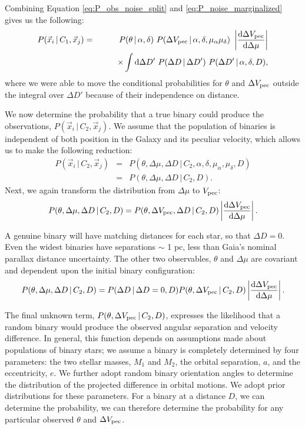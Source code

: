 \documentclass[12pt, preprint]{aastex}
\newcommand{\given}{\,|\,}
\newcommand{\dd}{\mathrm{d}}
\begin{document}
Combining Equation \ref{eq:P_obs_noise_split} and \ref{eq:P_noise_marginalized} gives us the following:
\begin{eqnarray}
P(\vec{x}_i \given C_1, \vec{x}_j) &=& P(\theta \given \alpha, \delta)\ 
   P(\Delta V_{\rm pec} \given \alpha, \delta, \mu_{\alpha} \mu_{\delta})\ 
   \left| \frac{\dd \Delta V_{\rm pec}}{\dd \Delta \mu} \right| \nonumber \\
   & & \qquad \times  \int \dd \Delta D'\ P(\Delta D \given \Delta D')\ P(\Delta D' \given \alpha, \delta, D),
\end{eqnarray}
where we were able to move the conditional probabilities for $\theta$ and $\Delta V_{\rm pec}$ outside the integral over $\Delta D'$ because of their independence on distance.


We now determine the probability that a true binary could produce the observations, $P(\vec{x}_i \given C_2, \vec{x}_j)$. We assume that the population of binaries is independent of both position in the Galaxy and its peculiar velocity, which allows us to make the following reduction:
\begin{eqnarray}
P(\vec{x}_i \given C_2, \vec{x}_j) &=& P(\theta, \Delta \mu, \Delta D \given C_2, \alpha, \delta, \mu_{\alpha}, \mu_{\delta}, D ) \\
&=& P(\theta, \Delta \mu, \Delta D \given C_2, D).
\end{eqnarray}
Next, we again transform the distribution from $\Delta \mu$ to $V_{\rm pec}$:
\begin{equation}
P(\theta, \Delta \mu, \Delta D \given C_2, D) = P(\theta, \Delta V_{\rm pec}, \Delta D \given C_2, D) \left| \frac{\dd \Delta V_{\rm pec}}{\dd \Delta \mu} \right|.
\end{equation}

A genuine binary will have matching distances for each star, so that $\Delta D = 0$. Even the widest binaries have separations $\sim$ 1 pc, less than Gaia's nominal parallax distance uncertainty. The other two observables, $\theta$ and $\Delta \mu$ are covariant and dependent upon the initial binary configuration:
\begin{equation}
P(\theta, \Delta \mu, \Delta D \given C_2, D) = P(\Delta D \given \Delta D=0, D) P(\theta, \Delta V_{\rm pec} \given C_2, D) \left| \frac{\dd \Delta V_{\rm pec}}{\dd \Delta \mu} \right|.
\end{equation}

The final unknown term, $P(\theta, \Delta V_{\rm pec} \given C_2, D)$, expresses the likelihood that a random binary would produce the observed angular separation and velocity difference. In general, this function depends on assumptions made about populations of binary stars; we assume a binary is completely determined by four parameters: the two stellar masses, $M_1$ and $M_2$, the orbital separation, $a$, and the eccentricity, $e$. We further adopt random binary orientation angles to determine the distribution of the projected difference in orbital motions. We adopt prior distributions for these parameters. For a binary at a distance $D$, we can determine the probability, we can therefore determine the probability for any particular observed $\theta$ and $\Delta V_{\rm pec}$.
\end{document}
